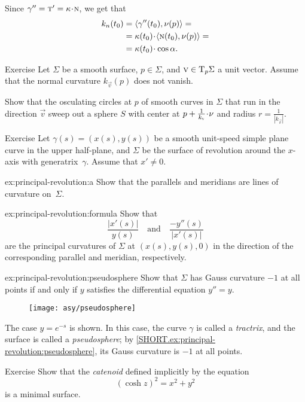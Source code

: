  Since $\gamma''=\tan'=\kur\cdot \norm$, we get that
\begin{align*}
k_{n}(t_0)&=\langle\gamma''(t_0),\Norm(p)\rangle=
\\
&=\kur(t_0)\cdot\langle\norm(t_0),\Norm(p)\rangle=
\\
&=\kur(t_0)\cdot\cos\alpha.
\end{align*}
\qedsf

\begin{thm}{Exercise}\label{ex:meusnier}
Let $\Sigma$ be a smooth surface, $p\in\Sigma$, and ${\text{\sc{v}}}\in \mathrm{T}_p\Sigma$ a unit vector.
Assume that the normal curvature $k_{\vec v}(p)$ does not vanish.

Show that the osculating circles at $p$ of smooth curves in $\Sigma$ that run in the direction ${\vec v}$ sweep out a sphere $S$ with center at $p+\tfrac1{k_{\vec v}}\cdot\Norm$ and radius $r=\tfrac1{|k_{\vec v}|}$.
\end{thm}

\begin{thm}{Exercise}\label{ex:principal-revolution}
Let $\gamma(s)=(x(s),y(s))$ be a smooth unit-speed simple plane curve in the upper half-plane,
and $\Sigma$ be the surface of revolution around the $x$-axis with generatrix~$\gamma$.
Assume that $x'\ne 0$.

\begin{subthm}{ex:principal-revolution:a}
Show that the parallels and meridians are lines of curvature on~$\Sigma$.
\end{subthm}

\begin{subthm}{ex:principal-revolution:formula}
Show that 
\[\frac{|x'(s)|}{y(s)}
\quad
\text{and}
\quad
\frac{-y''(s)}{|x'(s)|}
\]
are the principal curvatures of $\Sigma$ at $(x(s),y(s),0)$ in the direction of the corresponding parallel and meridian, respectively.
\end{subthm}

\begin{subthm}{ex:principal-revolution:pseudosphere}
Show that $\Sigma$ has Gauss curvature $-1$ at all points if and only if $y$ satisfies the differential equation $y''=y$. 
\end{subthm}

\end{thm}

{

\begin{wrapfigure}{r}{31 mm}
\vskip-0mm
\texttt{[image: asy/pseudosphere]}
\vskip-3mm
\end{wrapfigure}

The case \(y = e^{-s}\) is shown.
In this case, the curve \( \gamma \) is called a \emph{tractrix}, and the surface is called a \emph{pseudosphere};
by \ref{SHORT.ex:principal-revolution:pseudosphere}, its Gauss curvature is $-1$ at all points.


\begin{thm}{Exercise}\label{ex:catenoid-is-minimal}
Show that the \emph{catenoid} defined implicitly by the equation
\[(\cosh z)^2=x^2+y^2\]
is a minimal surface.
\end{thm}

}

